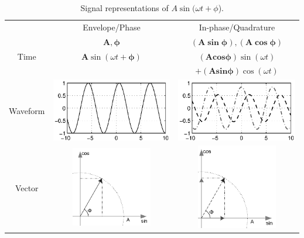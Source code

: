 \documentclass[letterpaper,12pt]{article}
\begin{document}
\begin{table}[htp]
\centering
\caption{Signal representations of ${A}\sin(\omega t+{\phi}$).}
\begin{tabular}{|c|c|c|}
\hline
&Envelope/Phase&In-phase/Quadrature\\
&$\mathbf{A,\phi}$ & $\mathbf{(A\sin\phi),(A\cos\phi)}$\\
\hline
{Time}& {$\mathbf{A}\sin(\omega t+\mathbf{\phi})$} & $\mathbf{(Acos\phi)}\sin(\omega t)$ \\
 & & $ + \mathbf{(Asin\phi)}\cos(\omega t)$\\
\hline
Waveform& {\includegraphics[width=150pt]{./1.eps}}& \includegraphics[width=150pt]{./2.eps}\\
\hline
Vector&\includegraphics[width=100pt]{./3.eps} &\includegraphics[width=100pt]{./4.eps} \\
\hline
\end{tabular}
\label{signaltable}
\end{table}
\end{document}
